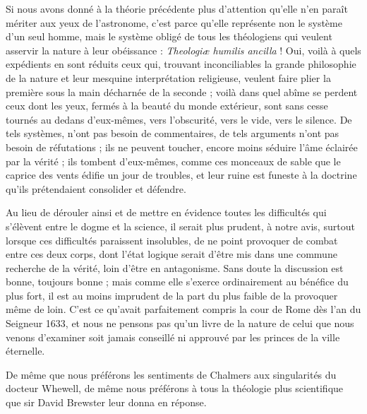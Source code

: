 \documentclass[a4paper, 11pt, oneside]{article}
\begin{document}
Si nous avons donné à la théorie précédente plus d'attention qu'elle n'en paraît mériter aux yeux de l'astronome, c'est parce qu'elle représente non le système d'un seul homme, mais le système obligé de tous les théologiens qui veulent asservir la nature à leur obéissance : \emph{Theologiæ humilis ancilla} ! Oui, voilà à quels expédients en sont réduits ceux qui, trouvant inconciliables la grande philosophie de la nature et leur mesquine interprétation religieuse, veulent faire plier la première sous la main décharnée de la seconde ; voilà dans quel abîme se perdent ceux dont les yeux, fermés à la beauté du monde extérieur, sont sans cesse tournés au dedans d'eux-mêmes, vers l'obscurité, vers le vide, vers le silence. De tels systèmes, n'ont pas besoin de commentaires, de tels arguments n'ont pas besoin de réfutations ; ils ne peuvent toucher, encore moins séduire l'âme éclairée par la vérité ; ils tombent d'eux-mêmes, comme ces monceaux de sable que le caprice des vents édifie un jour de troubles, et leur ruine est funeste à la doctrine qu'ils prétendaient consolider et défendre.

Au lieu de dérouler ainsi et de mettre en évidence toutes les difficultés qui s'élèvent entre le dogme et la science, il serait plus prudent, à notre avis, surtout lorsque ces difficultés paraissent insolubles, de ne point provoquer de combat entre ces deux corps, dont l'état logique serait d'être mis dans une commune recherche de la vérité, loin d'être en antagonisme. Sans doute la discussion est bonne, toujours bonne ; mais comme elle s'exerce ordinairement au bénéfice du plus fort, il est au moins imprudent de la part du plus faible de la provoquer même de loin. C'est ce qu'avait parfaitement compris la cour de Rome dès l'an du Seigneur 1633, et nous ne pensons pas qu'un livre de la nature de celui que nous venons d'examiner soit jamais conseillé ni approuvé par les princes de la ville éternelle.

De même que nous préférons les sentiments de Chalmers aux singularités du docteur Whewell, de même nous préférons à tous la théologie plus scientifique que sir David Brewster leur donna en réponse.
\end{document}
